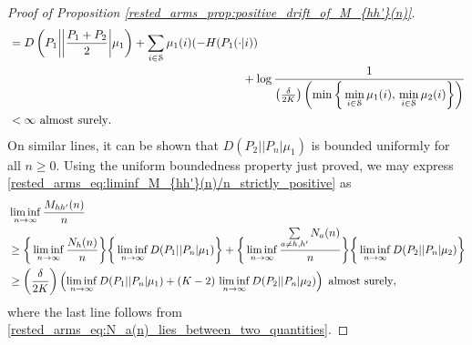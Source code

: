 \begin{proof}[Proof of Proposition \ref{rested_arms_prop:positive_drift_of_M_{hh'}(n)}]
\begin{align}
	&=D\left(P_1\bigg|\bigg|\frac{P_1+P_2}{2}\bigg\vert \mu_1\right)+\sum\limits_{i\in\mathcal{S}}\mu_1(i)(-H(P_1(\cdot|i))\nonumber\\
	&\hspace{7cm}+\log\frac{1}{\left(\frac{\delta}{2K}\right)\left(\min\bigg\lbrace\min\limits_{i\in\mathcal{S}}\mu_1(i),\,\min\limits_{i\in\mathcal{S}}\mu_2(i)\bigg\rbrace\right)}\nonumber\\
	&<\infty~\text{\text{almost surely}}.\label{rested_arms_eq:liminf_M_{hh'}(n)/n_strictly_positive_2}
\end{align}\endgroup
On similar lines, it can be shown that $D(P_2||P_n|\mu_1)$ is bounded uniformly  for all $n\geq 0$. Using the uniform boundedness property just proved, we may express \eqref{rested_arms_eq:liminf_M_{hh'}(n)/n_strictly_positive} as
\begingroup\allowdisplaybreaks\begin{align}
	&\liminf\limits_{n\to\infty}\frac{M_{hh'}(n)}{n}\nonumber\\
	&\geq \bigg\lbrace\liminf\limits_{n\to\infty}\frac{N_h(n)}{n}\bigg\rbrace\bigg\lbrace \liminf\limits_{n\to\infty}D(P_1||P_n|\mu_1)\bigg\rbrace+\bigg\lbrace\liminf\limits_{n\to\infty}\frac{\sum\limits_{a\neq h,h'}N_a(n)}{n}\bigg\rbrace\bigg\lbrace \liminf\limits_{n\to\infty}D(P_2||P_n|\mu_2)\bigg\rbrace\nonumber\\
	&\geq \left(\frac{\delta}{2K}\right)\left(\liminf\limits_{n\to\infty}D(P_1||P_n|\mu_1)+(K-2)\,\liminf\limits_{n\to\infty}D(P_2||P_n|\mu_2)\right)~\text{\text{almost surely}},\label{rested_arms_eq:liminf_M_{hh'}(n)/n_strictly_positive_3}
\end{align}\endgroup
where the last line follows from \eqref{rested_arms_eq:N_a(n)_lies_between_two_quantities}.


\end{proof}
